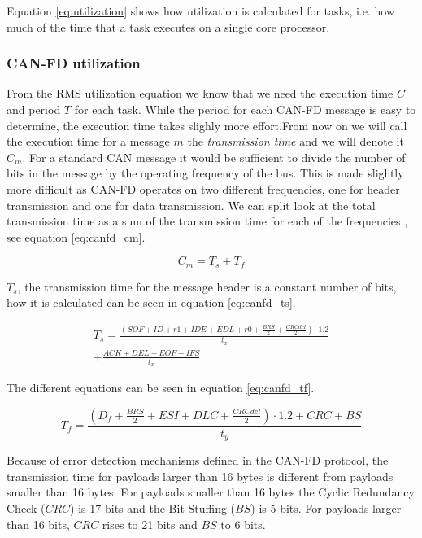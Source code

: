 Equation \ref{eq:utilization} shows how utilization is calculated for tasks, i.e. how much of the time that a task executes on a single core processor. 

\subsubsection{CAN-FD utilization}

From the RMS utilization equation we know that we need the execution time $C$ and period $T$ for each task. While the period for each CAN-FD message is easy to determine, the execution time takes slighly more effort.From now on we will call the execution time for a message $m$ the \emph{transmission time} and we will denote it $C_m$. For a standard CAN message it would be sufficient to divide the number of bits in the message by the operating frequency of the bus. This is made slightly more difficult as CAN-FD operates on two different frequencies, one for header transmission and one for data transmission. We can split look at the total transmission time as a sum of the transmission time for each of the frequencies , see equation \ref{eq:canfd_cm}.  

\begin{equation}
    C_m=T_s+T_f
    \label{eq:canfd_cm}
\end{equation}

$T_s$, the transmission time for the message header is a constant number of bits, how it is calculated can be seen in equation \ref{eq:canfd_ts}.

\begin{equation}
    \begin{gathered}
        T_s=\frac{(SOF+ID+r1+IDE+EDL+r0+\frac{BRS}{2}+\frac{CRCdel}{2})\cdot1.2}{t_x}\\+\frac{ACK+DEL+EOF+IFS}{t_x}
    \end{gathered}
    \label{eq:canfd_ts}
\end{equation}

The different equations can be seen in equation \ref{eq:canfd_tf}.

\begin{equation}
    T_f=\frac{(D_f+\frac{BRS}{2}+ESI+DLC+\frac{CRCdel}{2})\cdot1.2+CRC+BS}{t_y}
    \label{eq:canfd_tf}
\end{equation}

Because of error detection mechanisms defined in the CAN-FD protocol, the transmission time for payloads larger than 16 bytes is different from payloads smaller than 16 bytes. For payloads smaller than 16 bytes the Cyclic Redundancy Check ($CRC$) is 17 bits and the Bit Stuffing ($BS$) is 5 bits. For payloads larger than 16 bits, $CRC$ rises to 21 bits and $BS$ to 6 bits.


